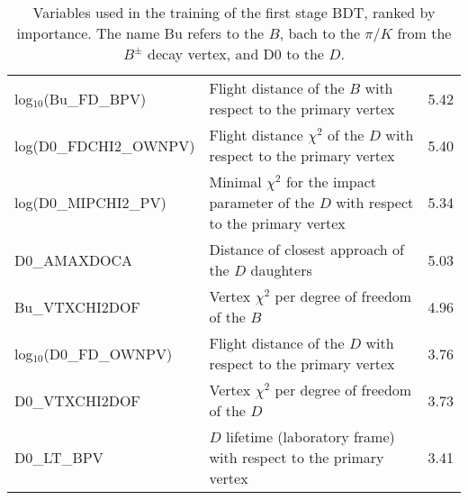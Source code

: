 \documentclass[oneside,12pt]{article}
\begin{document}
{\begin{landscape}
\begin{table}[]
{\begin{tabular}{lll}
log$_{10}$(Bu\_FD\_BPV)     & Flight  distance of the $B$ with respect to the 
primary vertex
                            & 5.42
                            \\
log(D0\_FDCHI2\_OWNPV)      & Flight distance $\chi^2$ of the $D$ with respect to
the primary vertex          & 5.40
                            \\
log(D0\_MIPCHI2\_PV)        & Minimal $\chi^2$ for the impact parameter of the $D$
with respect to the primary vertex
                            & 5.34
                            \\
D0\_AMAXDOCA                & Distance of closest approach of the $D$ daughters
                            & 5.03
                            \\
Bu\_VTXCHI2DOF              & Vertex $\chi^2$ per degree of freedom of the $B$
                            & 4.96
                            \\
log$_{10}$(D0\_FD\_OWNPV)   & Flight distance of the $D$ with respect to the
primary vertex              & 3.76
                            \\
D0\_VTXCHI2DOF              & Vertex $\chi^2$ per degree of freedom of the $D$
                            & 3.73
                            \\
D0\_LT\_BPV                 & $D$ lifetime (laboratory frame) with respect to 
the primary vertex          & 3.41
                            \\ \hline
\end{tabular}
} \caption{{Variables used in the training of the first stage BDT, ranked
by importance. The name Bu refers to the $B$, bach to the $\pi/K$ from the
$B^{\pm}$ decay vertex, and D0 to the $D$.}}
\label{table:bdt1TrainingVar}
\end{table}


\end{landscape}}
\end{document}
